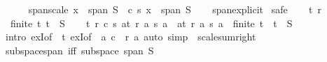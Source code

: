 \begin{isabellebody}
\ \ \ \ \isamarkupfalse%
\isanewline
{}\isamarkupfalse%
%
\endisatagproof
{\isafoldproof}%
%
\isadelimproof
\isanewline
%
\endisadelimproof
\isanewline
{}\isamarkupfalse%
\ span{\isacharunderscore}{\kern0pt}scale{\isacharcolon}{\kern0pt}\ {\isachardoublequoteopen}x\ {\isasymin}\ span\ S\ {\isasymLongrightarrow}\ c\ {\isacharasterisk}{\kern0pt}s\ x\ {\isasymin}\ span\ S{\isachardoublequoteclose}\isanewline
%
\isadelimproof
\ \ %
\endisadelimproof
%
\isatagproof
{}\isamarkupfalse%
\ span{\isacharunderscore}{\kern0pt}explicit\isanewline
{}\isamarkupfalse%
\ safe\isanewline
\ \ \isamarkupfalse%
\ t\ r\ \isamarkupfalse%
\ {\isacharasterisk}{\kern0pt}{\isacharcolon}{\kern0pt}\ {\isachardoublequoteopen}finite\ t{\isachardoublequoteclose}\ {\isachardoublequoteopen}t\ {\isasymsubseteq}\ S{\isachardoublequoteclose}\isanewline
\ \ \isamarkupfalse%
\ {\isachardoublequoteopen}{\isasymexists}t{\isacharprime}{\kern0pt}\ r{\isacharprime}{\kern0pt}{\isachardot}{\kern0pt}\ c\ {\isacharasterisk}{\kern0pt}s\ {\isacharparenleft}{\kern0pt}{\isasymSum}a{\isasymin}t{\isachardot}{\kern0pt}\ r\ a\ {\isacharasterisk}{\kern0pt}s\ a{\isacharparenright}{\kern0pt}\ {\isacharequal}{\kern0pt}\ {\isacharparenleft}{\kern0pt}{\isasymSum}a{\isasymin}t{\isacharprime}{\kern0pt}{\isachardot}{\kern0pt}\ r{\isacharprime}{\kern0pt}\ a\ {\isacharasterisk}{\kern0pt}s\ a{\isacharparenright}{\kern0pt}\ {\isasymand}\ finite\ t{\isacharprime}{\kern0pt}\ {\isasymand}\ t{\isacharprime}{\kern0pt}\ {\isasymsubseteq}\ S{\isachardoublequoteclose}\isanewline
\ \ \ \ \isamarkupfalse%
\ {\isacharparenleft}{\kern0pt}intro\ exI{\isacharbrackleft}{\kern0pt}of\ {\isacharunderscore}{\kern0pt}\ t{\isacharbrackright}{\kern0pt}\ exI{\isacharbrackleft}{\kern0pt}of\ {\isacharunderscore}{\kern0pt}\ {\isachardoublequoteopen}{\isasymlambda}a{\isachardot}{\kern0pt}\ c\ {\isacharasterisk}{\kern0pt}\ r\ a{\isachardoublequoteclose}{\isacharbrackright}{\kern0pt}{\isacharparenright}{\kern0pt}\ {\isacharparenleft}{\kern0pt}auto\ simp{\isacharcolon}{\kern0pt}\ {\isacharasterisk}{\kern0pt}\ scale{\isacharunderscore}{\kern0pt}sum{\isacharunderscore}{\kern0pt}right{\isacharparenright}{\kern0pt}\isanewline
{}\isamarkupfalse%
%
\endisatagproof
{\isafoldproof}%
%
\isadelimproof
\isanewline
%
\endisadelimproof
\isanewline
{}\isamarkupfalse%
\ subspace{\isacharunderscore}{\kern0pt}span\ {\isacharbrackleft}{\kern0pt}iff{\isacharbrackright}{\kern0pt}{\isacharcolon}{\kern0pt}\ {\isachardoublequoteopen}subspace\ {\isacharparenleft}{\kern0pt}span\ S{\isacharparenright}{\kern0pt}{\isachardoublequoteclose}\isanewline

\end{isabellebody}
